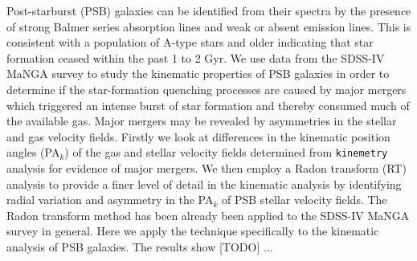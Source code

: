 
Post-starburst (PSB) galaxies can be identified from their spectra by the presence of strong Balmer series absorption lines and weak or absent emission lines. This is consistent with a population of A-type stars and older indicating that star formation ceased within the past 1 to 2 Gyr. We use data from the SDSS-IV MaNGA survey to study the kinematic properties of PSB galaxies in order to determine if the star-formation quenching processes are caused by major mergers which triggered an intense burst of star formation and thereby consumed much of the available gas. Major mergers may be revealed by asymmetries in the stellar and gas velocity fields. Firstly we look at differences in the kinematic position angles (PA$_{k}$) of the gas and stellar velocity fields determined from \texttt{kinemetry} analysis for evidence of major mergers. We then employ a Radon transform (RT) analysis to provide a finer level of detail in the kinematic analysis by identifying radial variation and asymmetry in the PA$_{k}$ of PSB stellar velocity fields. The Radon transform method has been already been applied to the SDSS-IV MaNGA survey in general. Here we apply the technique specifically to the kinematic analysis of PSB galaxies. The results show [TODO] ... 


